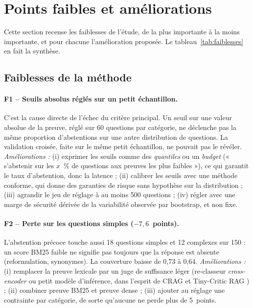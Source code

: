 \documentclass[11pt,a4paper]{article}
\begin{document}
\section{Points faibles et améliorations}\label{sec:faiblesses}

Cette section recense les faiblesses de l'étude, de la plus importante à la moins importante, et pour
chacune l'amélioration proposée. Le tableau~\ref{tab:faiblesses} en fait la synthèse.

\subsection{Faiblesses de la méthode}

\paragraph{F1 -- Seuils absolus réglés sur un petit échantillon.} C'est la cause directe de l'échec du
critère principal. Un seuil sur une valeur absolue de la preuve, réglé sur 60 questions par catégorie,
ne déclenche pas la même proportion d'abstentions sur une autre distribution de questions. La
validation croisée, faite sur le même petit échantillon, ne pouvait pas le révéler.
\emph{Améliorations :} (i) exprimer les seuils comme des \emph{quantiles} ou un \emph{budget} (« s'abstenir
sur les $x$~\% de questions aux preuves les plus faibles »), ce qui garantit le taux d'abstention, donc
la latence ; (ii) calibrer les seuils avec une méthode conforme, qui donne des garanties de risque sans
hypothèse sur la distribution \citep{hao2026racer} ; (iii) agrandir le jeu de réglage à au moins
500 questions ; (iv) régler avec une marge de sécurité dérivée de la variabilité observée par bootstrap,
et non fixe.

\paragraph{F2 -- Perte sur les questions simples ($-7{,}6$~points).} L'abstention précoce touche aussi
18 questions simples et 12 complexes sur 150 : un score BM25 faible ne signifie pas toujours que la
réponse est absente (reformulation, synonymes). La couverture baisse de 0,73 à 0,64.
\emph{Améliorations :} (i) remplacer la preuve lexicale par un juge de suffisance léger (re-classeur
\emph{cross-encoder} ou petit modèle d'inférence, dans l'esprit de CRAG \citep{yan2024crag} et
Tiny-Critic RAG \citep{wu2026tinycritic}) ; (ii) combiner preuve BM25 et preuve dense ; (iii) ajouter au
réglage une contrainte par catégorie, de sorte qu'aucune ne perde plus de 5~points.
\end{document}
